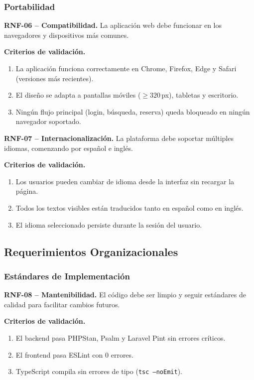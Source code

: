 \subsubsection*{Portabilidad}

\textbf{RNF-06 -- Compatibilidad.} \label{req:RNF-06}
La aplicación web debe funcionar en los navegadores y dispositivos más comunes.

\textbf{Criterios de validación.}
\begin{enumerate}
\item La aplicación funciona correctamente en Chrome, Firefox, Edge y Safari (versiones más recientes).
\item El diseño se adapta a pantallas móviles ($\geq 320$\,px), tabletas y escritorio.
\item Ningún flujo principal (login, búsqueda, reserva) queda bloqueado en ningún navegador soportado.
\end{enumerate}

\textbf{RNF-07 -- Internacionalización.} \label{req:RNF-07}
La plataforma debe soportar múltiples idiomas, comenzando por español e inglés.

\textbf{Criterios de validación.}
\begin{enumerate}
\item Los usuarios pueden cambiar de idioma desde la interfaz sin recargar la página.
\item Todos los textos visibles están traducidos tanto en español como en inglés.
\item El idioma seleccionado persiste durante la sesión del usuario.
\end{enumerate}

\subsection{Requerimientos Organizacionales}

\subsubsection*{Estándares de Implementación}

\textbf{RNF-08 -- Mantenibilidad.} \label{req:RNF-08}
El código debe ser limpio y seguir estándares de calidad para facilitar cambios futuros.

\textbf{Criterios de validación.}
\begin{enumerate}
\item El backend pasa PHPStan, Psalm y Laravel Pint sin errores críticos.
\item El frontend pasa ESLint con 0 errores.
\item TypeScript compila sin errores de tipo (\texttt{tsc --noEmit}).
\end{enumerate}

